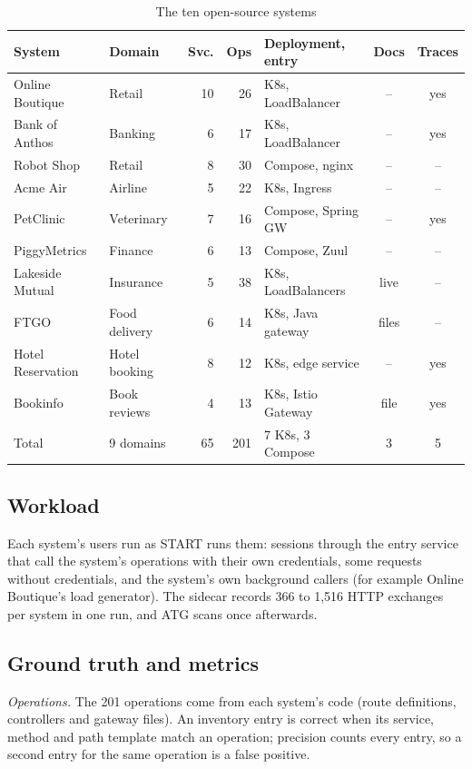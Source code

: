 \documentclass[conference]{IEEEtran}
\begin{document}
\begin{table}[t]
\caption{The ten open-source systems}
\label{tab:systems}
\centering
\scriptsize
\setlength{\tabcolsep}{2pt}
\begin{tabular}{@{}llrrlcc@{}}
\toprule
System & Domain & Svc. & Ops & Deployment, entry & Docs & Traces \\
\midrule
Online Boutique & Retail & 10 & 26 & K8s, LoadBalancer & -- & yes \\
Bank of Anthos & Banking & 6 & 17 & K8s, LoadBalancer & -- & yes \\
Robot Shop & Retail & 8 & 30 & Compose, nginx & -- & -- \\
Acme Air & Airline & 5 & 22 & K8s, Ingress & -- & -- \\
PetClinic & Veterinary & 7 & 16 & Compose, Spring GW & -- & yes \\
PiggyMetrics & Finance & 6 & 13 & Compose, Zuul & -- & -- \\
Lakeside Mutual & Insurance & 5 & 38 & K8s, LoadBalancers & live & -- \\
FTGO & Food delivery & 6 & 14 & K8s, Java gateway & files & -- \\
Hotel Reservation & Hotel booking & 8 & 12 & K8s, edge service & -- & yes \\
Bookinfo & Book reviews & 4 & 13 & K8s, Istio Gateway & file & yes \\
\midrule
Total & 9 domains & 65 & 201 & 7 K8s, 3 Compose & 3 & 5 \\
\bottomrule
\end{tabular}
\end{table}

\subsection{Workload}
Each system's users run as START runs them: sessions through the entry service that call the system's operations with their own credentials, some requests without credentials, and the system's own background callers (for example Online Boutique's load generator). The sidecar records 366 to 1,516 HTTP exchanges per system in one run, and ATG scans once afterwards.

\subsection{Ground truth and metrics}
\textit{Operations.} The 201 operations come from each system's code (route definitions, controllers and gateway files). An inventory entry is correct when its service, method and path template match an operation; precision counts every entry, so a second entry for the same operation is a false positive.
\end{document}
